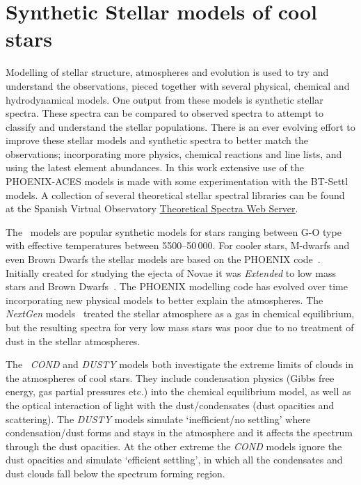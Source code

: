 

\section{Synthetic Stellar models of cool stars}
Modelling of stellar structure, atmospheres and evolution is used to try and understand the observations, pieced together with several physical, chemical and hydrodynamical models.
One output from these models is synthetic stellar spectra.
These spectra can be compared to observed spectra to attempt to classify and understand the stellar populations.
There is an ever evolving effort to improve these stellar models and synthetic spectra to better match the observations; incorporating more physics, chemical reactions and line lists, and using the latest element abundances.
In this work extensive use of the {PHOENIX-ACES} models is made with some experimentation with the {BT-Settl} models.
A collection of several theoretical stellar spectral libraries can be found at the Spanish Virtual Observatory \href{http://svo2.cab.inta-csic.es/theory/newov/index.php}{Theoretical Spectra Web Server}.

The~\citet{kurucz_model_1979} models are popular synthetic models for stars ranging between G-O type with effective temperatures between 5500--50\,000\K{}.
For cooler stars, M-dwarfs and even Brown Dwarfs the stellar models are based on the {PHOENIX} code~\citep[e.g.][]{hauschildt_parallel_1997}.
Initially created for studying the ejecta of Novae it was \emph{Extended} to low mass stars and Brown Dwarfs~\citep{allard_model_1995}.
The {PHOENIX} modelling code has evolved over time incorporating new physical models to better explain the atmospheres.
The \emph{NextGen} models~\citep{hauschildt_nextgen_1999} treated the stellar atmosphere as a gas in chemical equilibrium, but the resulting spectra for very low mass stars was poor due to no treatment of dust in the stellar atmospheres.

The~\citet{allard_limiting_2001} \emph{COND} and \emph{DUSTY} models both investigate the extreme limits of clouds in the atmospheres of cool stars.
They include condensation physics (Gibbs free energy, gas partial pressures etc.) into the chemical equilibrium model, as well as the optical interaction of light with the dust/condensates (dust opacities and scattering).
The \emph{DUSTY} models simulate `inefficient/no settling' where condensation/dust forms and stays in the atmosphere and it affects the spectrum through the dust opacities.
At the other extreme the \emph{COND} models ignore the dust opacities and simulate `efficient settling', in which all the condensates and dust clouds fall below the spectrum forming region.

